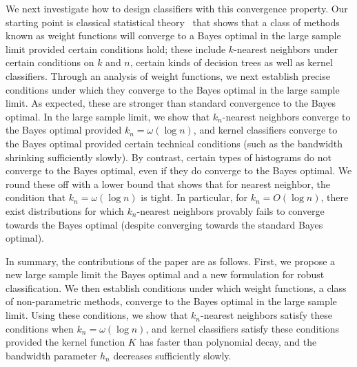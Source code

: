 We next investigate how to design classifiers with this convergence property. Our starting point is classical statistical theory~\cite{Stone77} that shows that a class of methods known as weight functions will converge to a Bayes optimal in the large sample limit provided certain conditions hold; these include $k$-nearest neighbors under certain conditions on $k$ and $n$, certain kinds of decision trees as well as kernel classifiers. Through an analysis of weight functions, we next establish precise conditions under which they converge to the \natural\emph{ }Bayes optimal in the large sample limit. As expected, these are stronger than standard convergence to the Bayes optimal. In the large sample limit, we show that $k_n$-nearest neighbors converge to the \natural\emph{ }Bayes optimal provided $k_n = \omega(\log n)$, and kernel classifiers converge to the \natural\emph{ }Bayes optimal provided certain technical conditions (such as the bandwidth shrinking sufficiently slowly). By contrast, certain types of histograms do not converge to the \natural\emph{ }Bayes optimal, even if they do converge to the Bayes optimal.  We round these off with a lower bound that shows that for nearest neighbor, the condition that $k_n = \omega(\log n)$ is tight. In particular, for $k_n = O(\log n)$, there exist distributions for which $k_n$-nearest neighbors provably fails to converge towards the \natural\emph{ }Bayes optimal (despite converging towards the standard Bayes optimal). 




In summary, the contributions of the paper are as follows. First, we propose a new large sample limit the \natural\emph{ }Bayes optimal and a new formulation for robust classification. We then establish conditions under which weight functions, a class of non-parametric methods, converge to the \natural\emph{ }Bayes optimal in the large sample limit. Using these conditions, we show that $k_n$-nearest neighbors satisfy these conditions when $k_n = \omega(\log n)$, and kernel classifiers satisfy these conditions provided the kernel function $K$ has faster than polynomial decay, and the bandwidth parameter $h_n$ decreases sufficiently slowly. 

